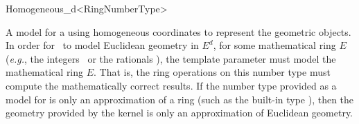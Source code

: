 \begin{ccRefClass}{Homogeneous_d<RingNumberType>}

\ccDefinition
A model for a  using homogeneous coordinates to represent the
geometric objects.  In order for \ccRefName\ to model Euclidean geometry
in $E^d$, for some mathematical ring $E$ (\textit{e.g.},
the integers \Z\ or the rationals \Q), the template parameter 
must model the mathematical ring $E$.  That is, the ring operations on this
number type must compute the mathematically correct results.  If the number
type provided as a model for  is only an approximation of a
ring (such as the built-in type ), then the geometry provided by
the kernel is only an approximation of Euclidean geometry.  

\ccIsModel
{}

\ccSeeAlso
{}

\end{ccRefClass}
